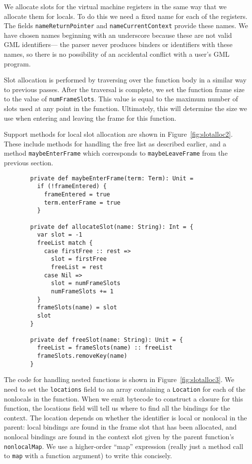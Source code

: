 We allocate slots for the virtual machine registers
in the same way that we allocate them for locals.
To do this we need a fixed name for each of the registers.
The fields \verb!nameReturnPointer! and \verb!nameCurrentContext!
provide these names.
We have chosen names beginning with an underscore
because these are not valid GML identifiers---%
the parser never produces binders or identifiers with these names,
so there is no possibility of an accidental conflict
with a user's GML program.

Slot allocation is performed by traversing over the function body
in a similar way to previous passes.
After the traversal is complete,
we set the function frame size to the value of \verb!numFrameSlots!.
This value is equal to the maximum number of slots used
at any point in the function.
Ultimately, this will determine the size we use
when entering and leaving the frame for this function.

Support methods for local slot allocation
are shown in Figure~\ref{fig:slotalloc2}.
These include methods for handling the free list as described earlier,
and a method \verb!maybeEnterFrame!
which corresponds to \verb!maybeLeaveFrame! from the previous section.

\begin{figure}
\begin{verbatim}
  private def maybeEnterFrame(term: Term): Unit =
    if (!frameEntered) {
      frameEntered = true
      term.enterFrame = true
    }

  private def allocateSlot(name: String): Int = {
    var slot = -1
    freeList match {
      case firstFree :: rest =>
        slot = firstFree
        freeList = rest
      case Nil =>
        slot = numFrameSlots
        numFrameSlots += 1
    }
    frameSlots(name) = slot
    slot
  }

  private def freeSlot(name: String): Unit = {
    freeList = frameSlots(name) :: freeList
    frameSlots.removeKey(name)
  }
\end{verbatim}
\getcaption
\end{figure}

The code for handling nested functions is shown in Figure~\ref{fig:slotalloc3}.
We need to set the \verb!locations! field to an array containing
a \verb!Location! for each of the nonlocals in the function.
When we emit bytecode to construct a closure for this function,
the locations field will tell us
where to find all the bindings for the context.
The location depends on whether the identifier is
local or nonlocal in the parent:
local bindings are found in the frame slot that has been allocated,
and nonlocal bindings are found in the context slot
given by the parent function's \verb!nonlocalMap!.
We use a higher-order ``map'' expression
(really just a method call to \verb!map! with a function argument)
to write this concisely.

